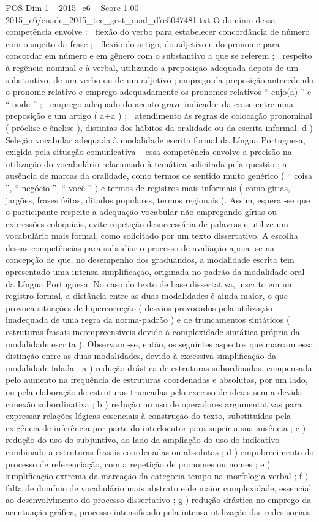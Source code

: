 \begin{textsample}{POS Dim 1 – 2015\_c6 – Score 1.00 – 2015\_c6/enade\_2015\_tec\_gest\_qual\_d7c5047481.txt}
O domínio dessa competência envolve :  flexão do verbo para estabelecer concordância de número com o sujeito da frase ;  flexão do artigo, do adjetivo e do pronome para concordar em número e em gênero com o substantivo a que se referem ;  respeito à regência nominal e à verbal, utilizando a preposição adequada depois de um substantivo, de um verbo ou de um adjetivo ; emprego da preposição antecedendo o pronome relativo e emprego adequadamente os pronomes relativos “ cujo(a) ” e “ onde ” ;  emprego adequado do acento grave indicador da crase entre uma preposição e um artigo ( a+a ) ;  atendimento às regras de colocação pronominal ( próclise e ênclise ), distintas dos hábitos da oralidade ou da escrita informal. d ) Seleção vocabular adequada à modalidade escrita formal da Língua Portuguesa, exigida pela situação comunicativa – essa competência envolve a precisão na utilização do vocabulário relacionado à temática solicitada pela questão ; a ausência de marcas da oralidade, como termos de sentido muito genérico ( “ coisa ”, “ negócio ”, “ você ” ) e termos de registros mais informais ( como gírias, jargões, frases feitas, ditados populares, termos regionais ).
Assim, espera -se que o participante respeite a adequação vocabular não empregando gírias ou expressões coloquiais, evite repetição desnecessária de palavras e utilize um vocabulário mais formal, como solicitado por um texto dissertativo.
A escolha dessas competências para subsidiar o processo de avaliação apoia -se na concepção de que, no desempenho dos graduandos, a modalidade escrita tem apresentado uma intensa simplificação, originada no padrão da modalidade oral da Língua Portuguesa.
No caso do texto de base dissertativa, inscrito em um registro formal, a distância entre as duas modalidades é ainda maior, o que provoca situações de hipercorreção ( desvios provocados pela utilização inadequada de uma regra da norma-padrão ) e de truncamentos sintáticos ( estruturas frasais incompreensíveis devido à complexidade sintática própria da modalidade escrita ).
Observam -se, então, os seguintes aspectos que marcam essa distinção entre as duas modalidades, devido à excessiva simplificação da modalidade falada : a ) redução drástica de estruturas subordinadas, compensada pelo aumento na frequência de estruturas coordenadas e absolutas, por um lado, ou pela elaboração de estruturas truncadas pelo excesso de ideias sem a devida conexão subordinativa ; b ) redução no uso de operadores argumentativas para expressar relações lógicas essenciais à construção do texto, substituídas pela exigência de inferência por parte do interlocutor para suprir a sua ausência ; c ) redução do uso do subjuntivo, ao lado da ampliação do uso do indicativo combinado a estruturas frasais coordenadas ou absolutas ; d ) empobrecimento do processo de referenciação, com a repetição de pronomes ou nomes ; e ) simplificação extrema da marcação da categoria tempo na morfologia verbal ; f ) falta de domínio de vocabulário mais abstrato e de maior complexidade, essencial ao desenvolvimento do processo dissertativo ; g ) redução drástica no emprego da acentuação gráfica, processo intensificado pela intensa utilização das redes sociais.

\end{textsample}
